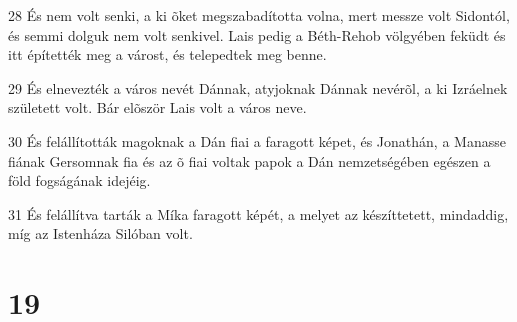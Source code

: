 \par 28 És nem volt senki, a ki õket megszabadította volna, mert messze volt Sidontól, és semmi dolguk nem volt senkivel. Lais pedig a Béth-Rehob völgyében feküdt és itt építették meg a várost, és telepedtek meg benne.
\par 29 És elnevezték a város nevét Dánnak, atyjoknak Dánnak nevérõl, a ki Izráelnek  született volt. Bár elõször Lais volt a város neve.
\par 30 És felállították magoknak a Dán fiai a faragott képet, és Jonathán, a Manasse fiának Gersomnak fia és az õ fiai voltak papok a Dán nemzetségében egészen a föld fogságának idejéig.
\par 31 És felállítva tarták a Míka faragott képét, a melyet az készíttetett, mindaddig, míg az Istenháza Silóban volt.

\chapter{19}

